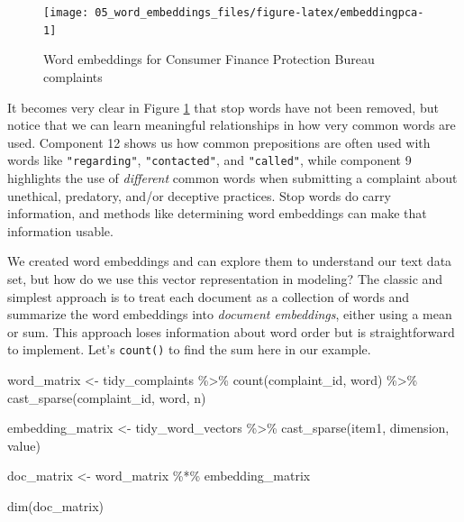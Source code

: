 \documentclass[
]{krantz}
\makeatletter
\newenvironment{Shaded}{\begin{snugshade}}{\end{snugshade}}
\newcommand{\FunctionTok}[1]{\textcolor[rgb]{0.00,0.00,0.00}{#1}}
\newcommand{\NormalTok}[1]{#1}
\newcommand{\OtherTok}[1]{\textcolor[rgb]{0.56,0.35,0.01}{#1}}
\newcommand{\SpecialCharTok}[1]{\textcolor[rgb]{0.00,0.00,0.00}{#1}}
\newenvironment{kframe}{%
\medskip{}
\setlength{\fboxsep}{.8em}
 \def\at@end@of@kframe{}%
 \ifinner\ifhmode%
  \def\at@end@of@kframe{\end{minipage}}%
  \begin{minipage}{\columnwidth}%
 \fi\fi%
 \def\FrameCommand##1{\hskip\@totalleftmargin \hskip-\fboxsep
 \colorbox{shadecolor}{##1}\hskip-\fboxsep
     \hskip-\linewidth \hskip-\@totalleftmargin \hskip\columnwidth}%
 \MakeFramed {\advance\hsize-\width
   \@totalleftmargin\z@ \linewidth\hsize
   \@setminipage}}%
 {\par\unskip\endMakeFramed%
 \at@end@of@kframe}
\renewenvironment{Shaded}{\begin{kframe}}{\end{kframe}}
\makeatother
\begin{document}
\begin{figure}

{\centering \texttt{[image: 05\_word\_embeddings\_files/figure-latex/embeddingpca-1]} 

}

\caption{Word embeddings for Consumer Finance Protection Bureau complaints}\label{fig:embeddingpca}
\end{figure}

It becomes very clear in Figure \ref{fig:embeddingpca} that stop words have not been removed, but notice that we can learn meaningful relationships in how very common words are used. Component 12 shows us how common prepositions are often used with words like \texttt{"regarding"}, \texttt{"contacted"}, and \texttt{"called"}, while component 9 highlights the use of \emph{different} common words when submitting a complaint about unethical, predatory, and/or deceptive practices. Stop words do carry information, and methods like determining word embeddings can make that information usable.

We created word embeddings and can explore them to understand our text data set, but how do we use this vector representation in modeling? The classic and simplest approach is to treat each document as a collection of words and summarize the word embeddings into \emph{document embeddings}, either using a mean or sum. This approach loses information about word order but is straightforward to implement. Let's \texttt{count()} to find the sum here in our example.

\begin{Shaded}
\begin{Highlighting}[]
\NormalTok{word\_matrix }\OtherTok{\textless{}{-}}\NormalTok{ tidy\_complaints }\SpecialCharTok{\%\textgreater{}\%}
  \FunctionTok{count}\NormalTok{(complaint\_id, word) }\SpecialCharTok{\%\textgreater{}\%}
  \FunctionTok{cast\_sparse}\NormalTok{(complaint\_id, word, n)}

\NormalTok{embedding\_matrix }\OtherTok{\textless{}{-}}\NormalTok{ tidy\_word\_vectors }\SpecialCharTok{\%\textgreater{}\%}
  \FunctionTok{cast\_sparse}\NormalTok{(item1, dimension, value)}

\NormalTok{doc\_matrix }\OtherTok{\textless{}{-}}\NormalTok{ word\_matrix }\SpecialCharTok{\%*\%}\NormalTok{ embedding\_matrix}

\FunctionTok{dim}\NormalTok{(doc\_matrix)}
\end{Highlighting}
\end{Shaded}
\end{document}
